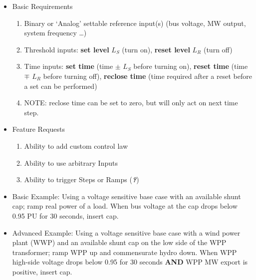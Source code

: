 \documentclass[12pt]{article}
\newcommand{\q}{(\textit{\textbf{?}})}
\begin{document}
\begin{multicols*}{2}
\begin{itemize}
	\item Basic Requirements
	\begin{enumerate}
		\item Binary or `Analog' settable reference input(s) (bus voltage, MW output, system frequency \ldots) 
		\item Threshold inputs: \textbf{set level} $L_S$ (turn on), \textbf{reset level} $L_R$ (turn off)
		\item Time inputs: \textbf{set time} (time $\pm$ $L_S$ before turning on), \textbf{reset time} (time $\mp$ $L_R$ before turning off), \textbf{reclose time} (time required after a reset before a set can be performed)
		\item NOTE: reclose time can be set to zero, but will only act on next time step.
	\end{enumerate}
	\item Feature Requests
	\begin{enumerate}
		\item Ability to add custom control law
		\item Ability to use arbitrary Inputs
		\item Ability to trigger Steps or Ramps \q
	\end{enumerate}
	\item Basic Example: Using a voltage sensitive base case with an available shunt cap; ramp real power of a load. When bus voltage at the cap drops below 0.95 PU for 30 seconds, insert cap.
	\item Advanced Example: Using a voltage sensitive base case with a wind power plant (WWP) and an available shunt cap on the low side of the WPP transformer; ramp WPP up and commensurate hydro down. When WPP high-side voltage drops below 0.95 for 30 seconds \textbf{AND} WPP MW export is positive, insert cap.
\end{itemize}

\vfill\null
\end{multicols*}
\end{document}
